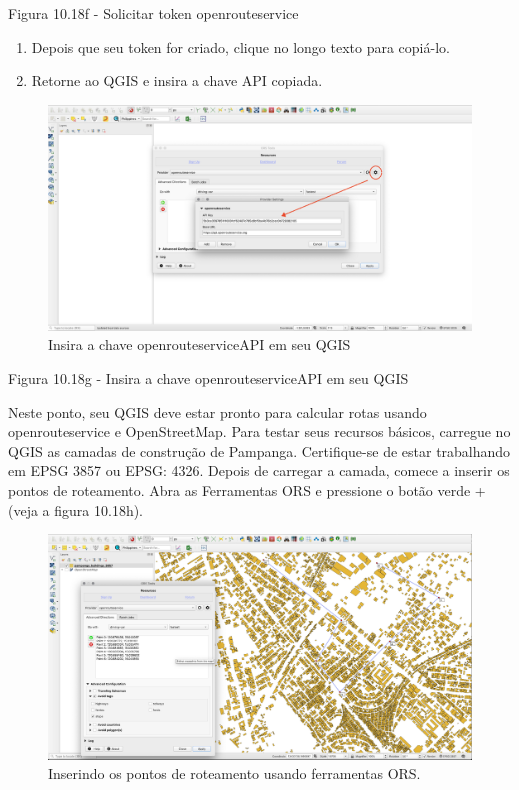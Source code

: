 \documentclass[
]{krantz}
\providecommand{\tightlist}{%
  \setlength{\itemsep}{0pt}\setlength{\parskip}{0pt}}
\begin{document}
Figura 10.18f - Solicitar token openrouteservice

\begin{enumerate}
\def\labelenumi{\arabic{enumi}.}
\setcounter{enumi}{4}
\tightlist
\item
  Depois que seu token for criado, clique no longo texto para copiá-lo.
\item
  Retorne ao QGIS e insira a chave API copiada.
\end{enumerate}

\begin{figure}
\centering
\includegraphics{media/modulo10/fig1018_g.png}
\caption{Insira a chave openrouteserviceAPI em seu QGIS}
\end{figure}

Figura 10.18g - Insira a chave openrouteserviceAPI em seu QGIS

Neste ponto, seu QGIS deve estar pronto para calcular rotas usando openrouteservice e OpenStreetMap. Para testar seus recursos básicos, carregue no QGIS as camadas de construção de Pampanga. Certifique-se de estar trabalhando em EPSG 3857 ou EPSG: 4326. Depois de carregar a camada, comece a inserir os pontos de roteamento. Abra as Ferramentas ORS e pressione o botão verde + (veja a figura 10.18h).

\begin{figure}
\centering
\includegraphics{media/modulo10/fig1018_h.png}
\caption{Inserindo os pontos de roteamento usando ferramentas ORS.}
\end{figure}
\end{document}
